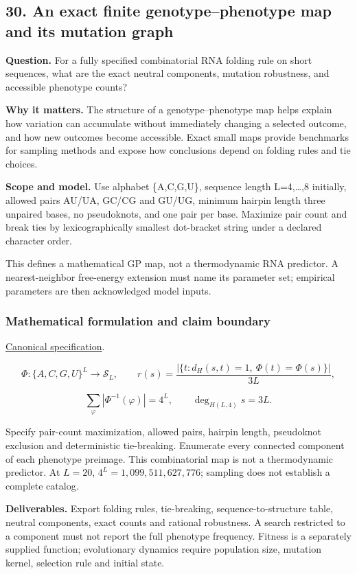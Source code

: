 \documentclass[
  11pt,
]{article}
\begin{document}
\subsection{30. An exact finite genotype--phenotype map and its mutation
graph}

\textbf{Question.} For a fully specified combinatorial RNA folding rule
on short sequences, what are the exact neutral components, mutation
robustness, and accessible phenotype counts?

\textbf{Why it matters.} The structure of a genotype--phenotype map
helps explain how variation can accumulate without immediately changing
a selected outcome, and how new outcomes become accessible. Exact small
maps provide benchmarks for sampling methods and expose how conclusions
depend on folding rules and tie choices.

\textbf{Scope and model.} Use alphabet \{A,C,G,U\}, sequence length
L=4,\ldots,8 initially, allowed pairs AU/UA, GC/CG and GU/UG, minimum
hairpin length three unpaired bases, no pseudoknots, and one pair per
base. Maximize pair count and break ties by lexicographically smallest
dot-bracket string under a declared character order.

This defines a mathematical GP map, not a thermodynamic RNA predictor. A
nearest-neighbor free-energy extension must name its parameter set;
empirical parameters are then acknowledged model inputs.

\subsubsection{Mathematical formulation and claim boundary}

\href{https://github.com/rick-stevens-ai/Pure-Thought/blob/main/PRDs/30-Genotype-Phenotype-Mapping.md}{Canonical
specification}.

\[\Phi:\{A,C,G,U\}^L\longrightarrow\mathcal S_L,\qquad
r(s)=\frac{|\{t:d_H(s,t)=1,\ \Phi(t)=\Phi(s)\}|}{3L},\]

\[\sum_{\varphi}|\Phi^{-1}(\varphi)|=4^L,\qquad
\deg_{H(L,4)}s=3L.\]

Specify pair-count maximization, allowed pairs, hairpin length,
pseudoknot exclusion and deterministic tie-breaking. Enumerate every
connected component of each phenotype preimage. This combinatorial map
is not a thermodynamic predictor. At \(L=20\),
\(4^L=1{,}099{,}511{,}627{,}776\); sampling does not establish a
complete catalog.

\textbf{Deliverables.} Export folding rules, tie-breaking,
sequence-to-structure table, neutral components, exact counts and
rational robustness. A search restricted to a component must not report
the full phenotype frequency. Fitness is a separately supplied function;
evolutionary dynamics require population size, mutation kernel,
selection rule and initial state.
\end{document}
